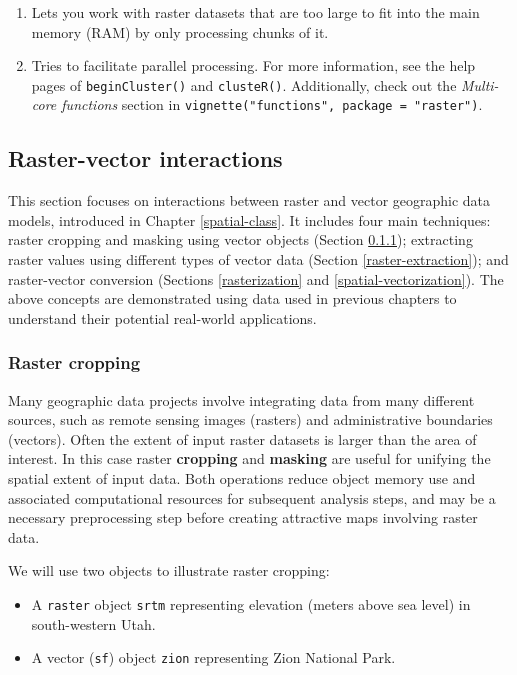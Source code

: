\documentclass[]{krantz}
\providecommand{\tightlist}{%
  \setlength{\itemsep}{0pt}\setlength{\parskip}{0pt}}
\begin{document}
\begin{enumerate}
\def\labelenumi{\arabic{enumi}.}
\tightlist
\item
  Lets you work with raster datasets that are too large to fit into the main memory (RAM) by only processing chunks of it.
\item
  Tries to facilitate parallel processing.
  For more information, see the help pages of \texttt{beginCluster()} and \texttt{clusteR()}.
  Additionally, check out the \emph{Multi-core functions} section in \texttt{vignette("functions",\ package\ =\ "raster")}.
\end{enumerate}

\hypertarget{raster-vector}{%
\subsection{Raster-vector interactions}\label{raster-vector}}

This section focuses on interactions between raster and vector geographic data models, introduced in Chapter \ref{spatial-class}.
It includes four main techniques:
raster cropping and masking using vector objects (Section \ref{raster-cropping});
extracting raster values using different types of vector data (Section \ref{raster-extraction});
and raster-vector conversion (Sections \ref{rasterization} and \ref{spatial-vectorization}).
The above concepts are demonstrated using data used in previous chapters to understand their potential real-world applications.

\hypertarget{raster-cropping}{%
\subsubsection{Raster cropping}\label{raster-cropping}}

Many geographic data projects involve integrating data from many different sources, such as remote sensing images (rasters) and administrative boundaries (vectors).
Often the extent of input raster datasets is larger than the area of interest.
In this case raster \textbf{cropping} and \textbf{masking} are useful for unifying the spatial extent of input data.
Both operations reduce object memory use and associated computational resources for subsequent analysis steps, and may be a necessary preprocessing step before creating attractive maps involving raster data.

We will use two objects to illustrate raster cropping:

\begin{itemize}
\tightlist
\item
  A \texttt{raster} object \texttt{srtm} representing elevation (meters above sea level) in south-western Utah.
\item
  A vector (\texttt{sf}) object \texttt{zion} representing Zion National Park.
\end{itemize}
\end{document}
